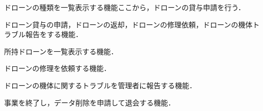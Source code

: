 \documentclass[a4paper, titlepage]{jsarticle}
\begin{document}
\begin{description}[labelwidth=\linewidth]
  \item [ドローン種類一覧機能]ドローンの種類を一覧表示する機能ここから，ドローンの貸与申請を行う．
  \item [ドローン貸与申請機能] ドローン貸与の申請，ドローンの返却，ドローンの修理依頼，ドローンの機体トラブル報告をする機能．
  \item [所持ドローン一覧機能]所持ドローンを一覧表示する機能．
  \item [ドローンの修理依頼機能]ドローンの修理を依頼する機能．
  \item [ドローンの機体トラブル報告]ドローンの機体に関するトラブルを管理者に報告する機能．
  \item [退会機能] 事業を終了し，データ削除を申請して退会する機能．
\end{description}

\end{document}
